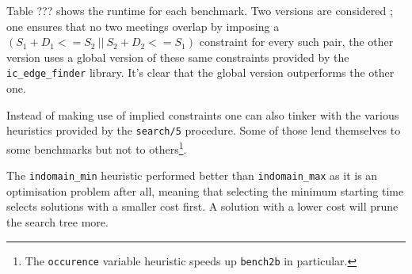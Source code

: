 Table ??? shows the runtime for each benchmark. Two versions are considered ; one ensures that no two meetings overlap by imposing a $(S_1+D_1<=S_2\ ||\ S_2+D_2<=S_1)$ constraint for every such pair, the other version uses a global version of these same constraints provided by the \texttt{ic\_edge\_finder} library. It's clear that the global version outperforms the other one.\\\par

Instead of making use of implied constraints one can also tinker with the various heuristics provided by the \texttt{search/5} procedure. Some of those lend themselves to some benchmarks but not to others\footnote{The \texttt{occurence} variable heuristic speeds up \texttt{bench2b} in particular.}.\par
The \texttt{indomain\_min} heuristic performed better than \texttt{indomain\_max} as it is an optimisation problem after all, meaning that selecting the minimum starting time selects solutions with a smaller cost first. A solution with a lower cost will prune the search tree more.